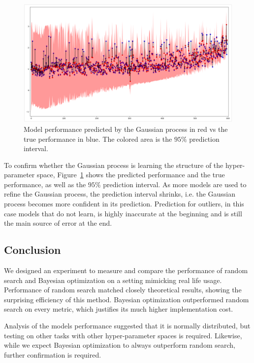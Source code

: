 \begin{figure}[htb]
	\centering
	\includegraphics[width=\linewidth]{img_hyperopt/bo_error_time.png}
	\caption{Model performance predicted by the Gaussian process in red vs the true performance in blue. The colored area is the $95 \%$ prediction interval.}
	\label{fig:bo_error_time}
\end{figure}

To confirm whether the Gaussian process is learning the structure of the hyper-parameter space, Figure~\ref{fig:bo_error_time} shows the predicted performance and the true performance, as well as the $95 \%$ prediction interval. As more models are used to refine the Gaussian process, the prediction interval shrinks, i.e. the Gaussian process becomes more confident in its prediction. Prediction for outliers, in this case models that do not learn, is highly inaccurate at the beginning and is still the main source of error at the end.

\subsection{Conclusion}

We designed an experiment to measure and compare the performance of random search and Bayesian optimization on a setting mimicking real life usage. Performance of random search matched closely theoretical results, showing the surprising efficiency of this method. Bayesian optimization outperformed random search on every metric, which justifies its much higher implementation cost.

Analysis of the models performance suggested that it is normally distributed, but testing on other tasks with other hyper-parameter spaces is required. Likewise, while we expect Bayesian optimization to always outperform random search, further confirmation is required.

